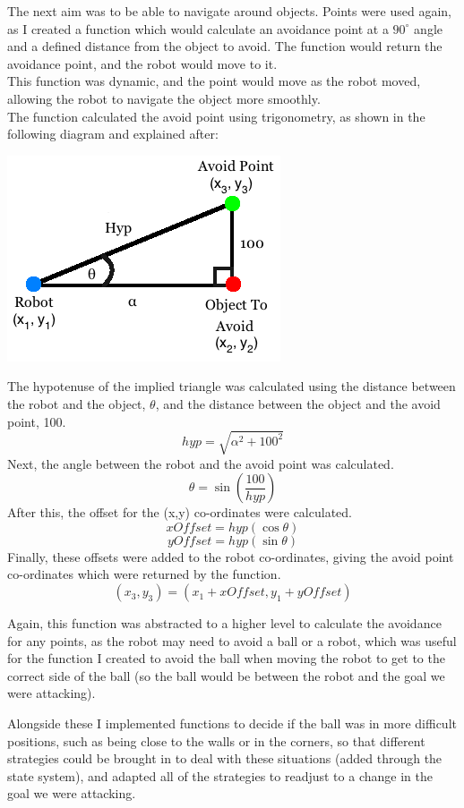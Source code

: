 \documentclass[12pt]{IEEEtran}
\begin{document}
The next aim was to be able to navigate around objects. Points were used again, as I created a function which would calculate an avoidance point at a $90^{\circ}$ angle and a defined distance from the object to avoid. The function would return the avoidance point, and the robot would move to it. \\
This function was dynamic, and the point would move as the robot moved, allowing the robot to navigate the object more smoothly.\\
The function calculated the avoid point using trigonometry, as shown in the following diagram and explained after:\\
\begin{center}
\includegraphics[scale=0.6]{AvoidPoints.png}\\
\end{center}
The hypotenuse of the implied triangle was calculated using the distance between the robot and the object, $\theta$, and the distance between the object and the avoid point, 100.
\[hyp = \sqrt{\alpha^{2} + 100^{2}}\]
Next, the angle between the robot and the avoid point was calculated.
\[\theta = \sin(\frac{100}{hyp})\]
After this, the offset for the (x,y) co-ordinates were calculated.
\[xOffset = hyp(\cos\theta)\]
\[yOffset = hyp(\sin\theta)\]
Finally, these offsets were added to the robot co-ordinates, giving the avoid point co-ordinates which were returned by the function.
\[(x_{3}, y_{3}) = (x_{1} + xOffset, y_{1} + yOffset)\]

Again, this function was abstracted to a higher level to calculate the avoidance for any points, as the robot may need to avoid a ball or a robot, which was useful for the function I created to avoid the ball when moving the robot to get to the correct side of the ball (so the ball would be between the robot and the goal we were attacking). \linebreak

Alongside these I implemented functions to decide if the ball was in more difficult positions, such as being close to the walls or in the corners, so that different strategies could be brought in to deal with these situations (added through the state system), and adapted all of the strategies to readjust to a change in the goal we were attacking.
\end{document}
